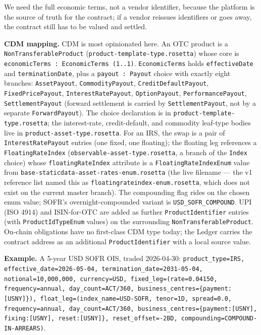\documentclass[11pt,a4paper]{article}
\begin{document}
We need the full economic terms, not a vendor identifier, because the platform is the source of truth for the contract; if a vendor reissues identifiers or goes away, the contract still has to be valued and settled.

\textbf{CDM mapping.} CDM is most opinionated here. An OTC product is a \texttt{NonTransferableProduct} (\texttt{product-template-type.rosetta}) whose core is \texttt{economicTerms : EconomicTerms (1..1)}. \texttt{EconomicTerms} holds \texttt{effectiveDate} and \texttt{terminationDate}, plus a \texttt{payout : Payout} choice with exactly eight branches: \texttt{AssetPayout}, \texttt{CommodityPayout}, \texttt{CreditDefaultPayout}, \texttt{FixedPricePayout}, \texttt{InterestRatePayout}, \texttt{OptionPayout}, \texttt{PerformancePayout}, \texttt{SettlementPayout} (forward settlement is carried by \texttt{SettlementPayout}, not by a separate \texttt{ForwardPayout}). The choice declaration is in \texttt{product-template-type.rosetta}; the interest-rate, credit-default, and commodity leaf-type bodies live in \texttt{product-asset-type.rosetta}. For an IRS, the swap is a pair of \texttt{InterestRatePayout} entries (one fixed, one floating); the floating leg references a \texttt{FloatingRateIndex} (\texttt{observable-asset-type.rosetta}, a branch of the \texttt{Index} choice) whose \texttt{floatingRateIndex} attribute is a \texttt{FloatingRateIndexEnum} value from \texttt{base-staticdata-asset-rates-enum.rosetta} (the live filename --- the v1 reference list named this as \texttt{floatingrateindex-enum.rosetta}, which does not exist on the current master branch). The compounding flag rides on the chosen enum value; SOFR's overnight-compounded variant is \texttt{USD\_SOFR\_COMPOUND}. UPI (ISO 4914) and ISIN-for-OTC are added as further \texttt{ProductIdentifier} entries (with \texttt{ProductIdTypeEnum} values) on the surrounding \texttt{NonTransferableProduct}. On-chain obligations have no first-class CDM type today; the Ledger carries the contract address as an additional \texttt{ProductIdentifier} with a local source value.

\textbf{Example.} A 5-year USD SOFR OIS, traded 2026-04-30: \texttt{product\_type=IRS, effective\_date=2026-05-04, termination\_date=2031-05-04, notional=10{,}000{,}000, currency=USD, fixed\_leg=(rate=0.04150, frequency=annual, day\_count=ACT/360, business\_centres=\{payment:[USNY]\}), float\_leg=(index\_name=USD-SOFR, tenor=1D, spread=0.0, frequency=annual, day\_count=ACT/360, business\_centres=\{payment:[USNY], fixing:[USNY], reset:[USNY]\}, reset\_offset=-2BD, compounding=COMPOUND-IN-ARREARS)}.
\end{document}
